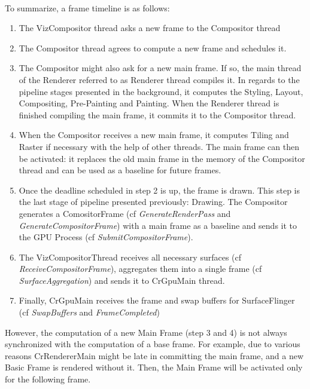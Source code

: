 \documentclass{kththesis}
\begin{document}



\paragraph{}
To summarize, a frame timeline is as follows:
\begin{enumerate}
    \item The VizCompositor thread asks a new frame to the Compositor thread
    \item The Compositor thread  agrees to compute a new frame and schedules it.
    \item The Compositor might also ask for a new main frame. If so, the main thread of the Renderer referred to as Renderer thread compiles it. In regards to the pipeline stages presented in the background, it computes the Styling, Layout, Compositing, Pre-Painting and Painting. When the Renderer thread is finished compiling the main frame, it commits it to the Compositor thread.
    \item When the Compositor receives a new main frame, it computes Tiling and Raster if necessary with the help of other threads. The main frame can then be activated: it replaces the old main frame in the memory of the Compositor thread and can be used as a baseline for future frames.
    \item Once the deadline scheduled in step 2 is up, the frame is drawn. This step is the last stage of pipeline presented previously: Drawing. The Compositor generates a ComositorFrame (cf \textit{GenerateRenderPass} and \textit{GenerateCompositorFrame}) with a main frame as a baseline and sends it to the GPU Process (cf \textit{SubmitCompositorFrame}).
    \item The VizCompositorThread receives all necessary surfaces (cf \textit{ReceiveCompositorFrame}), aggregates them into a single frame (cf \textit{SurfaceAggregation}) and sends it to CrGpuMain thread.
    \item Finally, CrGpuMain receives the frame and swap buffers for SurfaceFlinger (cf \textit{SwapBuffers} and \textit{FrameCompleted})
\end{enumerate}

However, the computation of a new Main Frame (step 3 and 4) is not always synchronized with the computation of a base frame. For example, due to various reasons  CrRendererMain might be late in committing the main frame, and a new Basic Frame is rendered without it. Then, the Main Frame will be activated only for the following frame.
\end{document}
